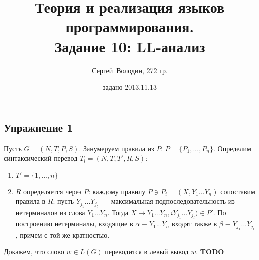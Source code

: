 \documentclass[a4paper]{article}
\title{Теория и реализация языков программирования.\\Задание 10: LL-анализ}
\date{задано 2013.11.13}
\author{Сергей~Володин, 272 гр.}
\begin{document}
\maketitle
\subsection*{Упражнение 1}
Пусть $G=(N,T,P,S)$. Занумеруем правила из $P$: $P=\{P_1,...,P_n\}$.\newline
Определим синтаксический перевод $T_l=(N, T, T', R, S)$:\begin{enumerate}
\item $T'=\{1,...,n\}$
\item $R$ определяется через $P$: каждому правилу $P\ni P_i=(X,Y_1...Y_n)$ сопоставим правила в $R$: пусть $Y_{j_1}...Y_{j_l}$~--- максимальная подпоследовательность из нетерминалов из слова $Y_1...Y_n$. Тогда $X\longrightarrow Y_1...Y_n,iY_{j_1}...Y_{j_l})\in P'$.\newline
По построению нетерминалы, входящие в $\alpha\equiv Y_1...Y_n$ входят также в $\beta\equiv Y_{j_1}...Y_{j_l}$, причем с той же кратностью.
\end{enumerate}
Докажем, что слово $w\in L(G)$ переводится в левый вывод $w$. {\bf TODO}
\end{document}
